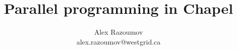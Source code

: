 \documentclass[10pt,xcolor=pdftex,dvipsnames,table]{beamer}
\begin{document}
\title[Slides PDF at \url{http://bit.ly/chapeltop}]{\LARGE Parallel programming in Chapel}
\author[]{{\large\sc Alex Razoumov}\\{\small alex.razoumov@westgrid.ca}\\}
\date[2019 WestGrid summer school]{}

\begin{frame}
  \titlepage
\end{frame}

\newcommand{\tnij}{\ensuremath{T^{(n)}_{i,j}}}

\end{document}
